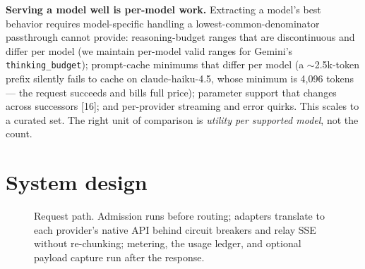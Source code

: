 \documentclass[10pt]{article}
\newcommand{\head}[1]{\textbf{#1}}
\begin{document}
\head{Serving a model well is per-model work.} Extracting a model's best behavior requires model-specific handling a lowest-common-denominator passthrough cannot provide: reasoning-budget ranges that are discontinuous and differ per model (we maintain per-model valid ranges for Gemini's \texttt{thinking\_budget}); prompt-cache minimums that differ per model (a $\sim$2.5k-token prefix silently fails to cache on claude-haiku-4.5, whose minimum is 4{,}096 tokens --- the request succeeds and bills full price); parameter support that changes across successors [16]; and per-provider streaming and error quirks. This scales to a curated set. The right unit of comparison is \emph{utility per supported model}, not the count.

\section{System design}\label{sec:design}

\begin{figure}[t]
\centering
{}
\caption{Request path. Admission runs before routing; adapters translate to each provider's native API behind circuit breakers and relay SSE without re-chunking; metering, the usage ledger, and optional payload capture run after the response.}
\label{fig:arch}
\end{figure}
\end{document}
